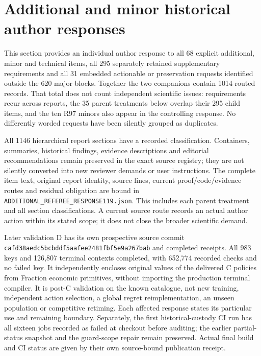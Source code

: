 
\section{Additional and minor historical author responses}\label{dev:additionalreferee119}

This section provides an individual author response to all 68 explicit additional, minor and technical items, all 295 separately retained supplementary requirements and all 31 embedded actionable or preservation requests identified outside the 620 major blocks. Together the two companions contain 1014 routed records. That total does not count independent scientific issues: requirements recur across reports, the 35 parent treatments below overlap their 295 child items, and the ten R97 minors also appear in the controlling response. No differently worded requests have been silently grouped as duplicates.

All 1146 hierarchical report sections have a recorded classification. Containers, summaries, historical findings, evidence descriptions and editorial recommendations remain preserved in the exact source registry; they are not silently converted into new reviewer demands or user instructions. The complete item text, original report identity, source lines, current proof/code/evidence routes and residual obligation are bound in \nolinkurl{ADDITIONAL_REFEREE_RESPONSE119.json}. This includes each parent treatment and all section classifications. A current source route records an actual author action within its stated scope; it does not close the broader scientific demand.

\begingroup\small

Later validation D has its own prospective source commit \nolinkurl{cafd38aedc5bcbddf5aafee2481fbf5e9a267bab} and completed receipts. All 983 keys and 126,807 terminal contexts completed, with 652,774 recorded checks and no failed key. It independently encloses original values of the delivered C policies from Fraction economic primitives, without importing the production terminal compiler. It is post-C validation on the known catalogue, not new training, independent action selection, a global regret reimplementation, an unseen population or competitive retiming. Each affected response states its particular use and remaining boundary. Separately, the first historical-custody CI run has all sixteen jobs recorded as failed at checkout before auditing; the earlier partial-status snapshot and the guard-scope repair remain preserved. Actual final build and CI status are given by their own source-bound publication receipt.


